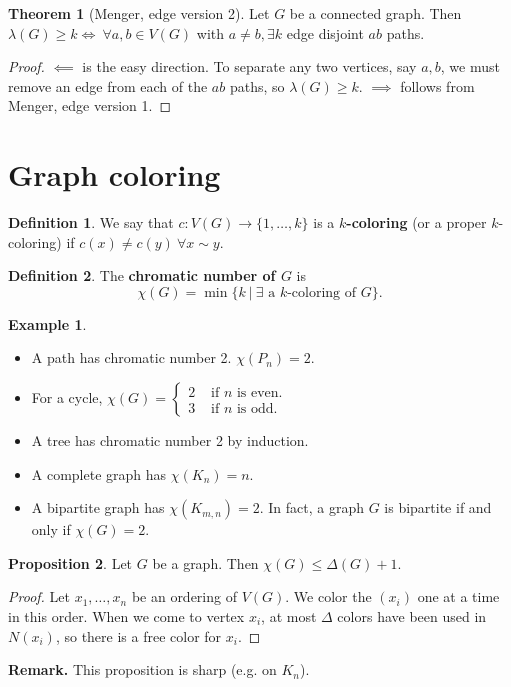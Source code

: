 \documentclass{article}
\theoremstyle{definition}
\newtheorem{theorem}{Theorem}[section]
\newtheorem{prop}[theorem]{Proposition}
\newtheorem{example}{Example}[section]
\newtheorem{defn}{Definition}[section]
\begin{document}
\begin{theorem}[Menger, edge version 2]
    Let $G$ be a connected graph. Then $\lambda(G)\ge k \iff ~\forall a,b \in V(G)$ with $a\neq b, \exists k$ edge disjoint $ab$ paths.
\end{theorem}
\begin{proof}
    $\impliedby$ is the easy direction. To separate any two vertices, say $a,b$, we must remove an edge from each of the $ab$ paths, so $\lambda(G)\ge k$.
    $\implies$ follows from Menger, edge version 1.
\end{proof}

\section{Graph coloring}
\begin{defn}
    We say that $c : V(G) \to \{1,\ldots,k\}$ is a \textbf{$k$-coloring} (or a proper $k$-coloring) if $c(x)\neq c(y) ~\forall x\sim y$. 
\end{defn}
\begin{defn}
    The \textbf{chromatic number of $G$} is \[
    \chi(G) = \min \{k ~|~ \exists \text{ a }k\text{-coloring of }G\}.
    \]
\end{defn}
\begin{example}
    \begin{itemize}
        \item A path has chromatic number 2. $\chi(P_n)=2$.
        \item For a cycle, $\chi(G) = \begin{cases}
            2 &\text{ if }n \text{ is even.}\\
            3 &\text{ if }n \text{ is odd.}
        \end{cases}$
        \item A tree has chromatic number 2 by induction.
        \item A complete graph has $\chi(K_n) = n$.
        \item A bipartite graph has $\chi(K_{m,n}) = 2$. In fact, a graph $G$ is bipartite if and only if $\chi(G)=2$.
    \end{itemize}
\end{example}
\begin{prop}
    Let $G$ be a graph. Then $\chi(G) \le \Delta(G) + 1$.
\end{prop}
\begin{proof}
    Let $x_1,\ldots,x_n$ be an ordering of $V(G)$. We color the $(x_i)$ one at a time in this order. When we come to vertex $x_i$, at most $\Delta$ colors have been used in $N(x_i)$, so there is a free color for $x_i$.
\end{proof}
\textbf{Remark.} This proposition is sharp (e.g. on $K_n$).
\end{document}
